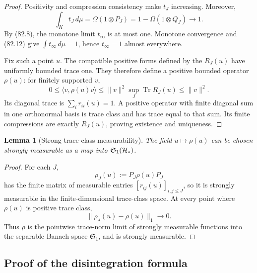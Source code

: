 \documentclass[11pt]{article}
\newtheorem{lemma}[theorem]{Lemma}
\theoremstyle{remark}
\begin{document}
\begin{proof}
Positivity and compression consistency make \(t_J\) increasing.
Moreover,
\[
 \int_Kt_J\,d\mu
 =\Omega(1\otimes P_J)
 =1-\Omega(1\otimes Q_J)\longrightarrow1.                  \tag{82.12}
\]
By (82.8), the monotone limit \(t_\infty\) is at most one.
Monotone convergence and (82.12) give
\(\int t_\infty\,d\mu=1\), hence \(t_\infty=1\) almost
everywhere.

Fix such a point \(u\).  The compatible positive forms defined by
the \(R_J(u)\) have uniformly bounded trace one.  They therefore
define a positive bounded operator \(\rho(u)\): for finitely
supported \(v\),
\[
 0\leq\langle v,\rho(u)v\rangle
 \leq\|v\|^2\sup_J\operatorname{Tr}R_J(u)\leq\|v\|^2.
\]
Its diagonal trace is
\(\sum_i r_{ii}(u)=1\).  A positive operator with finite diagonal
sum in one orthonormal basis is trace class and has trace equal to
that sum.  Its finite compressions are exactly \(R_J(u)\), proving
existence and uniqueness.
\end{proof}

\begin{lemma}[Strong trace-class measurability]
\label{lem:v12v82-measurable}
The field \(u\mapsto\rho(u)\) can be chosen strongly measurable as a
map into \({\mathfrak S}_1({\cal H}_*)\).
\end{lemma}

\begin{proof}
For each \(J\),
\[
                         \rho_J(u):=P_J\rho(u)P_J
\]
has the finite matrix of measurable entries
\([r_{ij}(u)]_{i,j\leq J}\), so it is strongly measurable in the
finite-dimensional trace-class space.  At every point where
\(\rho(u)\) is positive trace class,
\[
                         \|\rho_J(u)-\rho(u)\|_1\longrightarrow0.
\]
Thus \(\rho\) is the pointwise trace-norm limit of strongly
measurable functions into the separable Banach space
\({\mathfrak S}_1\), and is strongly measurable.
\end{proof}

\subsection{Proof of the disintegration formula}
\end{document}
